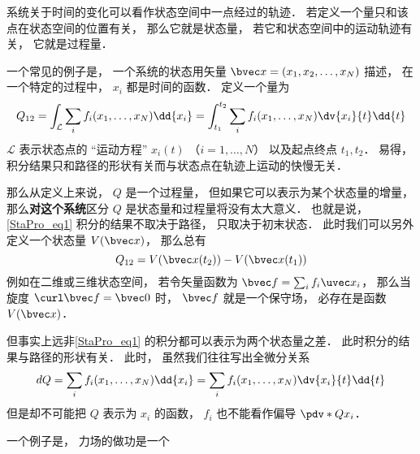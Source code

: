 
\begin{issues}
\issueDraft
\end{issues}

系统关于时间的变化可以看作状态空间中一点经过的轨迹． 若定义一个量只和该点在状态空间的位置有关， 那么它就是状态量， 若它和状态空间中的运动轨迹有关， 它就是过程量．

一个常见的例子是， 一个系统的状态用矢量 $\bvec x = (x_1, x_2, \dots, x_N)$ 描述， 在一个特定的过程中， $x_i$ 都是时间的函数． 定义一个量为
\begin{equation}\label{StaPro_eq1}
Q_{12} = \int_{\mathcal L} \sum_i f_i(x_1, \dots, x_N) \dd{x_i} = \int_{t_1}^{t_2} \sum_i f_i(x_1, \dots, x_N) \dv{x_i}{t} \dd{t}
\end{equation}
$\mathcal L$ 表示状态点的 “运动方程” $x_i(t)$ （$i = 1,\dots, N$） 以及起点终点 $t_1, t_2$． 易得，积分结果只和路径的形状有关而与状态点在轨迹上运动的快慢无关．

那么从定义上来说， $Q$ 是一个过程量， 但如果它可以表示为某个状态量的增量， 那么\textbf{对这个系统}区分 $Q$ 是状态量和过程量将没有太大意义． 也就是说， \autoref{StaPro_eq1} 积分的结果不取决于路径， 只取决于初末状态． 此时我们可以另外定义一个状态量 $V(\bvec x)$， 那么总有
\begin{equation}
Q_{12} = V(\bvec x(t_2)) - V(\bvec x(t_1))
\end{equation}
例如在二维或三维状态空间， 若令矢量函数为 $\bvec f = \sum_i f_i \uvec x_i$， 那么当旋度 $\curl \bvec f = \bvec 0$ 时， $\bvec f$ 就是一个保守场， 必存在是函数 $V(\bvec x)$．

但事实上远非\autoref{StaPro_eq1} 的积分都可以表示为两个状态量之差． 此时积分的结果与路径的形状有关． 此时， 虽然我们往往写出全微分关系
\begin{equation}
dQ = \sum_i f_i(x_1, \dots, x_N) \dd{x_i} = \sum_i f_i(x_1, \dots, x_N) \dv{x_i}{t} \dd{t}
\end{equation}
但是却不可能把 $Q$ 表示为 $x_i$ 的函数， $f_i$ 也不能看作偏导 $\pdv*{Q}{x_i}$．

一个例子是， 力场的做功是一个

